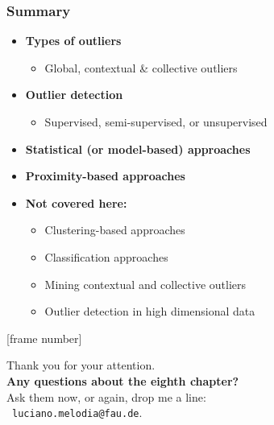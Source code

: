 \documentclass[aspectratio=169,t,xcolor=dvipsnames]{beamer}
\begin{document}
%

\begin{frame}
	\frametitle{Summary}
	\begin{itemize}
		\item  \textbf{Types of outliers}
		      \begin{itemize}
		      	\item Global, contextual \& collective outliers
		      \end{itemize}
		\item \textbf{Outlier detection}
		      \begin{itemize}
		      	\item Supervised, semi-supervised, or unsupervised
		      \end{itemize}
		\item \textbf{Statistical (or model-based) approaches}
		\item \textbf{Proximity-based approaches}
		\item \textbf{Not covered here:}
		      \begin{itemize}
		      	\item Clustering-based approaches
		      	\item Classification approaches
		      	\item Mining contextual and collective outliers
		      	\item Outlier detection in high dimensional data
		      \end{itemize}
	\end{itemize}
\end{frame}

  
  { %
    [frame number]
    \begin{frame}[c]
      \begin{center}
        Thank you for your attention.\\
        {\bf Any questions about the eighth chapter?}\\[0.5cm]
        Ask them now, or again, drop me a line: \\
        \faSendO \ \texttt{luciano.melodia@fau.de}.
      \end{center}
    \end{frame}
  }
  
\end{document}
